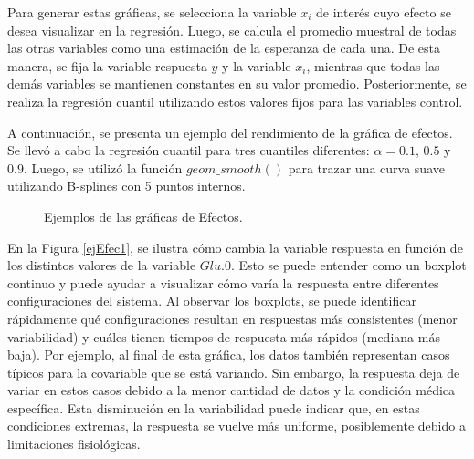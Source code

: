 Para generar estas gráficas, se selecciona la variable $x_i$ de interés cuyo efecto se desea visualizar en la regresión. Luego, se calcula el promedio muestral de todas las otras variables como una estimación de la esperanza de cada una. De esta manera, se fija la variable respuesta $y$ y la variable $x_i$, mientras que todas las demás variables se mantienen constantes en su valor promedio. Posteriormente, se realiza la regresión cuantil utilizando estos valores fijos para las variables control.

A continuación, se presenta un ejemplo del rendimiento de la gráfica de efectos. Se llevó a cabo la regresión cuantil para tres cuantiles diferentes: $\alpha = 0.1$, $0.5$ y $0.9$. Luego, se utilizó la función $geom\_smooth()$ para trazar una curva suave utilizando B-splines con 5 puntos internos. 

\begin{figure}[H]
 \centering
    \caption{Ejemplos de las gráficas de Efectos.}
    \label{fig:Efectos}
\end{figure}

En la Figura \ref{ejEfec1}, se ilustra cómo cambia la variable respuesta en función de los distintos valores de la variable $Glu.0$. Esto se puede entender como un boxplot continuo y puede ayudar a visualizar cómo varía la respuesta entre diferentes configuraciones del sistema. Al observar los boxplots, se puede identificar rápidamente qué configuraciones resultan en respuestas más consistentes (menor variabilidad) y cuáles tienen tiempos de respuesta más rápidos (mediana más baja). Por ejemplo, al final de esta gráfica, los datos también representan casos típicos para la covariable que se está variando. Sin embargo, la respuesta deja de variar en estos casos debido a la menor cantidad de datos y la condición médica específica. Esta disminución en la variabilidad puede indicar que, en estas condiciones extremas, la respuesta se vuelve más uniforme, posiblemente debido a limitaciones fisiológicas.


